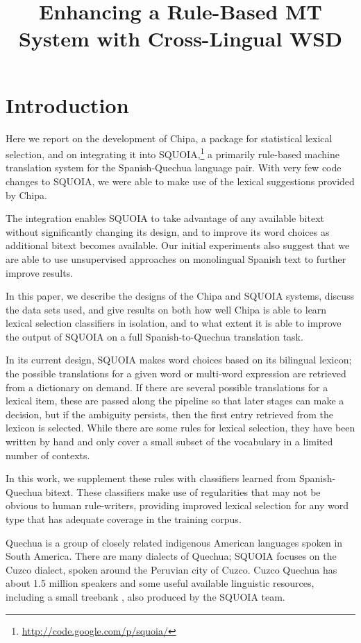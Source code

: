 \documentclass[10pt, a4paper]{article}
\title{Enhancing a Rule-Based MT System with Cross-Lingual WSD}
\begin{document}
\maketitleabstract

\section{Introduction}
Here we report on the development of Chipa, a package for statistical
lexical selection, and on integrating it into
SQUOIA,\footnote{\url{http://code.google.com/p/squoia/}} a primarily rule-based
machine translation system for the Spanish-Quechua language pair.  With very
few code changes to SQUOIA, we were able to make use of the lexical suggestions
provided by Chipa.

The integration enables SQUOIA to take advantage of any available bitext
without significantly changing its design, and to improve its word choices as
additional bitext becomes available. Our initial experiments also suggest that
we are able to use unsupervised approaches on monolingual Spanish text to
further improve results.

In this paper, we describe the designs of the Chipa and SQUOIA systems, discuss
the data sets used, and give results on both how well Chipa is able to learn
lexical selection classifiers in isolation, and to what extent it is able to
improve the output of SQUOIA on a full Spanish-to-Quechua translation task.

In its current design, SQUOIA makes word choices based on its bilingual
lexicon; the possible translations for a given word or multi-word expression
are retrieved from a dictionary on demand. If there are several possible
translations for a lexical item, these are passed along the pipeline so
that later stages can make a decision, but if the ambiguity persists,
then the first entry retrieved from the lexicon is selected. While there are
some rules for lexical selection, they have been written by hand and only cover
a small subset of the vocabulary in a limited number of contexts.

In this work, we supplement these rules with classifiers learned from
Spanish-Quechua bitext. These classifiers make use of regularities that may not
be obvious to human rule-writers, providing improved lexical selection for
any word type that has adequate coverage in the training corpus.

Quechua is a group of closely related indigenous American languages spoken in
South America. There are many dialects of Quechua; SQUOIA focuses on the
Cuzco dialect, spoken around the Peruvian city of Cuzco.  Cuzco Quechua has
about 1.5 million speakers and some useful available linguistic resources,
including a small treebank \cite{rios2009quechua}, also produced by the SQUOIA
team.
\end{document}
